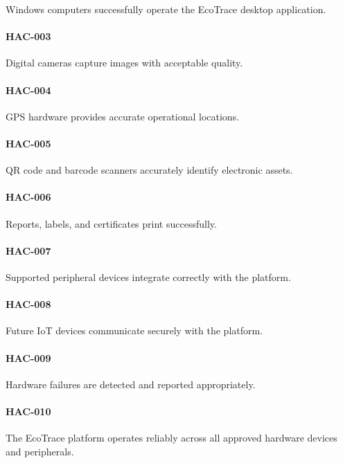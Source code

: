 Windows computers successfully operate the EcoTrace desktop
application.

\paragraph{HAC-003}

Digital cameras capture images with acceptable quality.

\paragraph{HAC-004}

GPS hardware provides accurate operational locations.

\paragraph{HAC-005}

QR code and barcode scanners accurately identify electronic assets.

\paragraph{HAC-006}

Reports, labels, and certificates print successfully.

\paragraph{HAC-007}

Supported peripheral devices integrate correctly with the platform.

\paragraph{HAC-008}

Future IoT devices communicate securely with the platform.

\paragraph{HAC-009}

Hardware failures are detected and reported appropriately.

\paragraph{HAC-010}

The EcoTrace platform operates reliably across all approved hardware
devices and peripherals.

